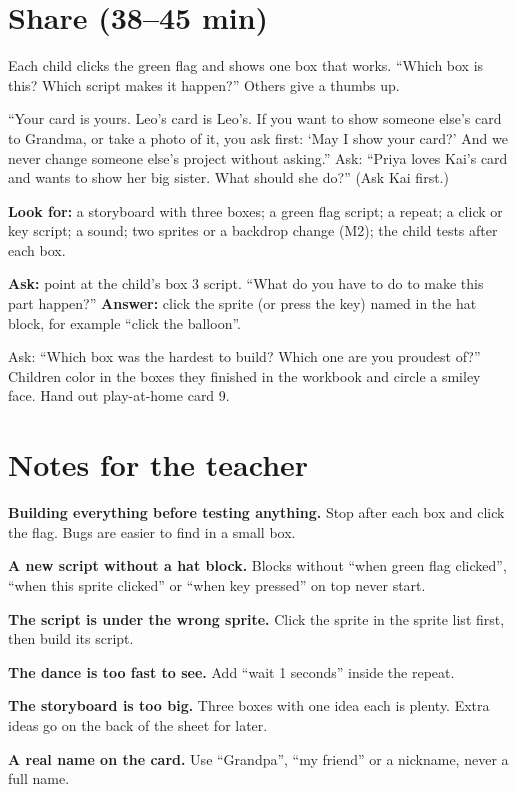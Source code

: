 \section{Share (38--45 min)}
\begin{teacherscript}
Each child clicks the green flag and shows one box that works. \enquote{Which box is this? Which script makes it happen?} Others give a thumbs up.
\end{teacherscript}

\begin{safety}
\enquote{Your card is yours. Leo's card is Leo's. If you want to show someone else's card to Grandma, or take a photo of it, you ask first: \enquote{May I show your card?} And we never change someone else's project without asking.} Ask: \enquote{Priya loves Kai's card and wants to show her big sister. What should she do?} (Ask Kai first.)
\end{safety}

\begin{formativecheck}
\textbf{Look for:} a storyboard with three boxes; a green flag script; a repeat; a click or key script; a sound; two sprites or a backdrop change (M2); the child tests after each box.

\textbf{Ask:} point at the child's box 3 script. \enquote{What do you have to do to make this part happen?}
\textbf{Answer:} click the sprite (or press the key) named in the hat block, for example \enquote{click the balloon}.
\end{formativecheck}

\begin{reflection}
Ask: \enquote{Which box was the hardest to build? Which one are you proudest of?} Children color in the boxes they finished in the workbook and circle a smiley face. Hand out play-at-home card 9.
\end{reflection}

\section{Notes for the teacher}
\begin{commonmistakes}
  \item \textbf{Building everything before testing anything.} Stop after each box and click the flag. Bugs are easier to find in a small box.
  \item \textbf{A new script without a hat block.} Blocks without \enquote{when green flag clicked}, \enquote{when this sprite clicked} or \enquote{when key pressed} on top never start.
  \item \textbf{The script is under the wrong sprite.} Click the sprite in the sprite list first, then build its script.
  \item \textbf{The dance is too fast to see.} Add \enquote{wait 1 seconds} inside the repeat.
  \item \textbf{The storyboard is too big.} Three boxes with one idea each is plenty. Extra ideas go on the back of the sheet for later.
  \item \textbf{A real name on the card.} Use \enquote{Grandpa}, \enquote{my friend} or a nickname, never a full name.
\end{commonmistakes}

